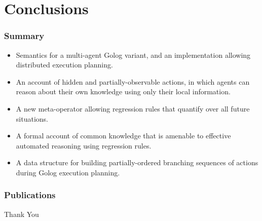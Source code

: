 \documentclass{beamer}
\begin{document}
\section{Conclusions}

\begin{frame}
  \frametitle{Summary}
  \begin{itemize}
  \item Semantics for a multi-agent Golog variant, and an implementation allowing distributed execution planning.
  \item An account of hidden and partially-observable actions, in which agents can reason about their own knowledge using only their local information.
  \item A new meta-operator allowing regression rules that quantify over all future situations.
  \item A formal account of common knowledge that is amenable to effective automated reasoning using regression rules.
  \item A data structure for building partially-ordered branching sequences of actions during Golog execution planning.
  \end{itemize}
\end{frame}

\begin{frame}
\frametitle{Publications}
\small
\nocite{kelly06hlp_dps}
\nocite{kelly07sc_persistence}
\nocite{kelly07sc_know_obs}
\nocite{kelly08complex_epistemic_modalities}


\normalsize
\end{frame}

\begin{frame}
\centering \large Thank You\\
\end{frame}
\end{document}
